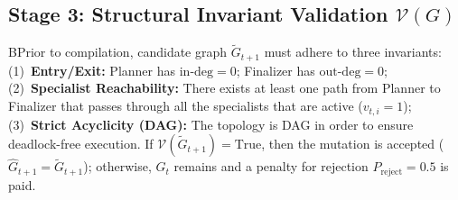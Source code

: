 ﻿\documentclass[conference]{IEEEtran}
\begin{document}
\subsection{Stage 3: Structural Invariant Validation $\mathcal{V}(G)$}
BPrior to compilation, candidate graph $\widetilde{G}_{t+1}$ must adhere to three invariants: (1)~\textbf{Entry/Exit:} Planner has $\mathrm{in\text{-}deg} = 0$; Finalizer has $\mathrm{out\text{-}deg} = 0$; (2)~\textbf{Specialist Reachability:} There exists at least one path from Planner to Finalizer that passes through all the specialists that are active ($v_{t,i}=1$); (3)~\textbf{Strict Acyclicity (DAG):} The topology is DAG in order to ensure deadlock-free execution. If $\mathcal{V}(\widetilde{G}_{t+1}) = \text{True}$, then the mutation is accepted ($\widehat{G}_{t+1} = \widetilde{G}_{t+1}$); otherwise, $G_t$ remains and a penalty for rejection $P_{\mathrm{reject}} = 0.5$ is paid.
\end{document}
